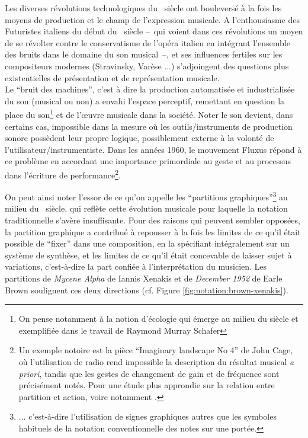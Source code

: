 \indent Les diverses révolutions technologiques du ~siècle ont bouleversé à la fois les moyens de production et le champ de l'expression musicale. A l'enthousiasme des Futuristes italiens du début du ~siècle --~qui voient dans ces révolutions un moyen de se révolter contre le conservatisme de l'opéra italien en intégrant l'ensemble des bruits dans le domaine du son musical~--, et ses influences fertiles sur les compositeurs modernes (Stravinsky, Varèse ...) s'adjoingent des questions plus existentielles de présentation et de représentation musicale.\\
\indent Le ``bruit des machines'', c'est à dire la production automatisée et industrialisée du son (musical ou non) a envahi l'espace perceptif, remettant en question la place du son\footnote{On pense notamment à la notion d'écologie qui émerge au milieu du siècle et exemplifiée dans le travail de Raymond Murray Schafer} et de l'œuvre musicale dans la société. Noter le son devient, dans certains cas, impossible dans la mesure où les outils/instruments de production sonore possèdent leur propre logique, possiblement externe à la volonté de l'utilisateur/instrumentiste. Dans les années 1960, le mouvement Fluxus répond à ce problème en accordant une importance primordiale au geste et au processus dans l'écriture de performance\footnote{Un exemple notoire est la pièce ``Imaginary landscape No 4'' de John Cage, où l'utilisation de radio rend impossible la description du résultat musical \textit{a priori}, tandis que les gestes de changement de gain et de fréquence sont précisément notés. Pour une étude plus approndie sur la relation entre partition et action, voire notamment \cite{kojs_notating_2011}.}.

\indent On peut ainsi noter l'essor de ce qu'on appelle les ``partitions graphiques''\footnote{... c'est-à-dire l'utilisation de signes graphiques autres que les symboles habituels de la notation conventionnelle des notes sur une portée.} au milieu du ~siècle, qui reflète cette évolution musicale pour laquelle la notation traditionnelle s'avère insuffisante. Pour des raisons qui peuvent sembler opposées, la partition graphique a contribué à repousser à la fois les limites de ce qu'il était possible de ``fixer'' dans une composition, en la spécifiant intégralement sur un système de synthèse, et les limites de ce qu'il était concevable de laisser sujet à variations, c'est-à-dire la part confiée à l'interprétation du musicien. Les partitions de \textit{Mycene Alpha} de Iannis Xenakis et de \textit{December 1952} de Earle Brown soulignent ces deux directions (cf. Figure \ref{fig:notation:brown-xenakis}).

